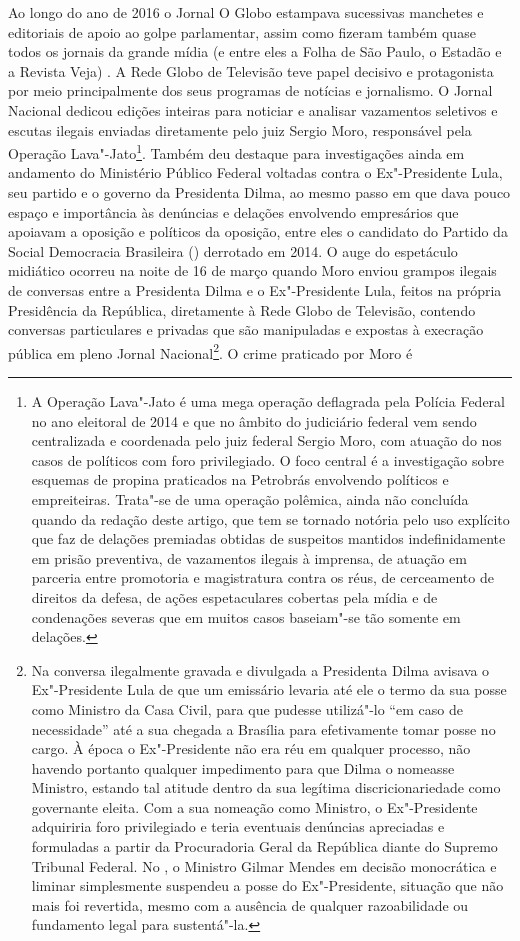 Ao longo do ano de 2016 o Jornal O Globo estampava sucessivas manchetes
e editoriais de apoio ao golpe parlamentar, assim como fizeram também
quase todos os jornais da grande mídia (e entre eles a Folha de São
Paulo, o Estadão e a Revista Veja) . A Rede Globo de Televisão teve
papel decisivo e protagonista por meio principalmente dos seus programas
de notícias e jornalismo. O Jornal Nacional dedicou edições inteiras
para noticiar e analisar vazamentos seletivos e escutas ilegais enviadas
diretamente pelo juiz Sergio Moro, responsável pela Operação
Lava"-Jato\footnote{A Operação Lava"-Jato é uma mega operação deflagrada
  pela Polícia Federal no ano eleitoral de 2014 e que no âmbito do
  judiciário federal vem sendo centralizada e coordenada pelo juiz
  federal Sergio Moro, com atuação do  nos casos de políticos com
  foro privilegiado. O foco central é a investigação sobre esquemas de
  propina praticados na Petrobrás envolvendo políticos e empreiteiras.
  Trata"-se de uma operação polêmica, ainda não concluída quando da
  redação deste artigo, que tem se tornado notória pelo uso explícito
  que faz de delações premiadas obtidas de suspeitos mantidos
  indefinidamente em prisão preventiva, de vazamentos ilegais à
  imprensa, de atuação em parceria entre promotoria e magistratura
  contra os réus, de cerceamento de direitos da defesa, de ações
  espetaculares cobertas pela mídia e de condenações severas que em
  muitos casos baseiam"-se tão somente em delações.}. Também deu destaque
para investigações ainda em andamento do Ministério Público Federal
voltadas contra o Ex"-Presidente Lula, seu partido e o governo da
Presidenta Dilma, ao mesmo passo em que dava pouco espaço e importância
às denúncias e delações envolvendo empresários que apoiavam a oposição e
políticos da oposição, entre eles o candidato do Partido da Social
Democracia Brasileira () derrotado em 2014. O auge do espetáculo
midiático ocorreu na noite de 16 de março quando Moro enviou grampos
ilegais de conversas entre a Presidenta Dilma e o Ex"-Presidente Lula,
feitos na própria Presidência da República, diretamente à Rede Globo de
Televisão, contendo conversas particulares e privadas que são
manipuladas e expostas à execração pública em pleno Jornal
Nacional\footnote{Na conversa ilegalmente gravada e divulgada a
  Presidenta Dilma avisava o Ex"-Presidente Lula de que um emissário
  levaria até ele o termo da sua posse como Ministro da Casa Civil, para
  que pudesse utilizá"-lo ``em caso de necessidade'' até a sua chegada a
  Brasília para efetivamente tomar posse no cargo. À época o
  Ex"-Presidente não era réu em qualquer processo, não havendo portanto
  qualquer impedimento para que Dilma o nomeasse Ministro, estando tal
  atitude dentro da sua legítima discricionariedade como governante
  eleita. Com a sua nomeação como Ministro, o Ex"-Presidente adquiriria
  foro privilegiado e teria eventuais denúncias apreciadas e formuladas
  a partir da Procuradoria Geral da República diante do Supremo Tribunal
  Federal. No , o Ministro Gilmar Mendes em decisão monocrática e
  liminar simplesmente suspendeu a posse do Ex"-Presidente, situação que
  não mais foi revertida, mesmo com a ausência de qualquer razoabilidade
  ou fundamento legal para sustentá"-la.}. O crime praticado por Moro é

